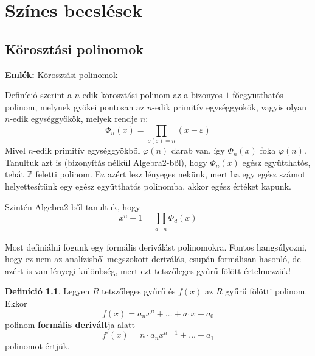 \documentclass[12pt]{book}
\theoremstyle{plain} %
\theoremstyle{definition} %
\newtheorem{defi/}{Definíció}[section]
\newenvironment{defi}
  {\renewcommand{\qedsymbol}{$\clubsuit$}%
   \pushQED{\qed}\begin{defi/}}
  {\popQED\end{defi/}}
\theoremstyle{remark}
\renewcommand\qedsymbol{$\blacksquare$}
\numberwithin{equation}{section}  %
\def\Z{\mathbb{Z}}
\begin{document}
	

	\chapter{Színes becslések}
	
	
	\section{Körosztási polinomok}
	
	\textbf{Emlék:} Körosztási polinomok
	
	Definíció szerint a $n$-edik körosztási polinom az a bizonyos $1$ főegyütthatós polinom, melynek gyökei pontosan az $n$-edik primitív egységgyökök, vagyis olyan $n$-edik egységgyökök, melyek rendje $n$:
	\[ \Phi_n(x) = \prod_{o(\varepsilon) = n} (x-\varepsilon)  \]
	Mivel $n$-edik primitív egységgyökből $\varphi(n)$ darab van, így $\Phi_n(x)$ foka $\varphi(n)$. Tanultuk azt is (bizonyítás nélkül Algebra2-ből), hogy $\Phi_n(x)$ egész együtthatós, tehát $\Z$ feletti polinom. Ez azért lesz lényeges nekünk, mert ha egy egész számot helyettesítünk egy egész együtthatós polinomba, akkor egész értéket kapunk.
	
	Szintén Algebra2-ből tanultuk, hogy
	\[  x^n - 1 = \prod_{d\mid n} \Phi_d(x)  \]
	\hrulefill
	
	Most definiálni fogunk egy formális deriválást polinomokra. Fontos hangsúlyozni, hogy ez nem az analízisből megszokott deriválás, csupán formálisan hasonló, de azért is van lényegi különbség, mert ezt tetszőleges gyűrű fölött értelmezzük!
	
	\begin{defi}
		Legyen $R$ tetszőleges gyűrű és $f(x)$ az $R$ gyűrű fölötti polinom. Ekkor
		\[ f(x) = a_n x^n + \ldots + a_1 x + a_0  \]
		polinom \textbf{formális derivált}ja alatt
		\[ f'(x) = n\cdot a_n x^{n-1} + \ldots + a_1  \]
		polinomot értjük.
	\end{defi}
\end{document}
